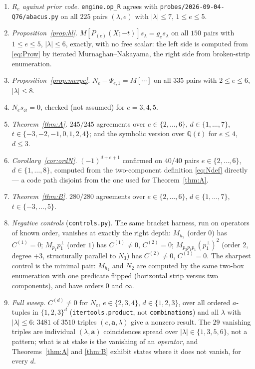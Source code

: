 \documentclass[11pt]{article}
\theoremstyle{plain}
\theoremstyle{definition}
\newcommand{\Q}{\mathbb{Q}}
\begin{document}
\begin{enumerate}
\item \emph{$R_e$ against prior code.}  \verb|engine.op_R| agrees with
\verb|probes/2026-09-04-Q76/abacus.py| on all $225$ pairs
$(\lambda,e)$ with $|\lambda|\le7$, $1\le e\le5$.
\item \emph{Proposition~\ref{prop:hl}.}  $M[P_{(e)}(X;-t)]s_\lambda=g_e s_\lambda$
on all $150$ pairs with $1\le e\le5$, $|\lambda|\le6$, exactly, with no free
scalar: the left side is computed from \eqref{eq:Prow} by iterated
Murnaghan--Nakayama, the right side from broken-strip enumeration.
\item \emph{Proposition~\ref{prop:merge}.}  $N_e-\Psi_{e,1}=M[\cdots]$ on all
$335$ pairs with $2\le e\le6$, $|\lambda|\le8$.
\item \emph{$N_e s_\varnothing=0$}, checked (not assumed) for $e=3,4,5$.
\item \emph{Theorem~\ref{thm:A}.}  $245/245$ agreements over
$e\in\{2,\dots,6\}$, $d\in\{1,\dots,7\}$, $t\in\{-3,-2,-1,0,1,2,4\}$; and the
symbolic version over $\Q(t)$ for $e\le4$, $d\le3$.
\item \emph{Corollary~\ref{cor:ordN}.}  $(-1)^{d+e+1}$ confirmed on $40/40$
pairs $e\in\{2,\dots,6\}$, $d\in\{1,\dots,8\}$, computed from the
two-component definition \eqref{eq:Ndef} directly --- a code path disjoint from
the one used for Theorem~\ref{thm:A}.
\item \emph{Theorem~\ref{thm:B}.}  $280/280$ agreements over
$e\in\{2,\dots,6\}$, $d\in\{1,\dots,7\}$, $t\in\{-3,\dots,5\}$.
\item \emph{Negative controls} (\verb|controls.py|).  The same bracket harness,
run on operators of known order, vanishes at exactly the right depth:
$M_{h_2}$ (order $0$) has $C^{(1)}=0$; $M_{p_1}p_1^{\perp}$ (order $1$) has
$C^{(1)}\neq0$, $C^{(2)}=0$; $M_{p_3p_1p_1}(p_1^{\perp})^2$ (order $2$, degree
$+3$, structurally parallel to $N_3$) has $C^{(2)}\neq0$, $C^{(3)}=0$.  The
sharpest control is the minimal pair: $M_{h_2}$ and $N_2$ are computed by the
same two-box enumeration with one predicate flipped (horizontal strip versus two
components), and have orders $0$ and $\infty$.
\item \emph{Full sweep.}  $C^{(d)}\neq0$ for $N_e$, $e\in\{2,3,4\}$,
$d\in\{1,2,3\}$, over all ordered $a$-tuples in $\{1,2,3\}^d$
(\texttt{itertools.product}, not \texttt{combinations}) and all $\lambda$ with
$|\lambda|\le6$: $3481$ of $3510$ triples $(e,\mathbf a,\lambda)$ give a nonzero
result.  The $29$ vanishing triples are individual $(\lambda,\mathbf a)$
coincidences spread over $|\lambda|\in\{1,3,5,6\}$, not a pattern; what is at
stake is the vanishing of an \emph{operator}, and Theorems~\ref{thm:A} and
\ref{thm:B} exhibit states where it does not vanish, for every $d$.
\end{enumerate}
\end{document}
